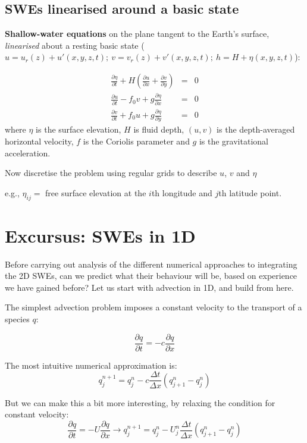 \subsection{SWEs linearised around a basic state} 

{\bf Shallow-water equations} on the
plane tangent to the Earth's surface, {\em linearised} about a resting basic state ($u=u_r(z)+u'(x,y,z,t); ~ v=v_r(z)+v'(x,y,z,t); ~ h=H+\eta(x,y,z,t)$):

\begin{eqnarray}
	\frac{\partial \eta}{\partial t} + H \left(
	\frac{\partial u}{\partial x}+\frac{\partial v}{\partial y}\right) & = & 0 \\
	\frac{\partial u}{\partial t} - f_0 v  + g\frac{\partial \eta}{\partial x} & = & 0 \\
	\frac{\partial v}{\partial t} + f_0 u  + g\frac{\partial \eta}{\partial y} & = & 0 
\end{eqnarray}
where $\eta$ is the surface elevation, $H$ is fluid depth, $(u,v)$ is
the depth-averaged horizontal velocity, $f$ is the Coriolis parameter
and $g$ is the gravitational acceleration. 

Now discretise the problem using regular grids to describe $u$, $v$ and $\eta$ 

e.g., $\eta_{ij}=$ free surface elevation at the $i$th longitude and $j$th
latitude point.

\section{Excursus: SWEs in 1D}

Before carrying out analysis of the different numerical approaches to integrating the 2D SWEs, can we predict what their behaviour will be, based on experience we have gained before? Let us start with advection in 1D, and build from here.

The simplest advection problem imposes a constant velocity to the transport of a species $q$:

\begin{equation}
	\frac{\partial q}{\partial t} = - c \frac{\partial q}{\partial x} 
\end{equation}

The most intuitive numerical approximation is:
\begin{equation}
	q_j^{n+1} = q_j^n - c \frac {\Delta t}{\Delta x} (q_{j+1}^n - q_j^n)
\end{equation}

But we can make this a bit more interesting, by relaxing the condition for constant velocity:
\begin{equation}
	\frac{\partial q}{\partial t} = - U \frac{\partial q}{\partial x}  \rightarrow  q_j^{n+1} = q_j^n - U_j^n \frac {\Delta t}{\Delta x} (q_{j+1}^n - q_j^n)
\end{equation}

